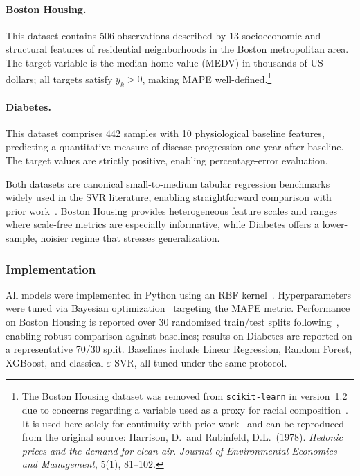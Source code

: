 \documentclass[mathematics,article,submit,pdftex,moreauthors]{Definitions/mdpi}
\begin{document}
\paragraph{Boston Housing.}

This dataset contains 506 observations described by 13
socioeconomic and structural features of residential
neighborhoods in the Boston metropolitan area.
The target variable is the median home value (MEDV) in
thousands of US dollars; all targets satisfy $y_k > 0$,
making MAPE well-defined.\footnote{The Boston Housing dataset
was removed from \texttt{scikit-learn} in version~1.2 due to
concerns regarding a variable used as a proxy for racial
composition~\cite{Pedregosa2011}. It is used here solely for
continuity with prior work~\cite{benavides2025support} and can
be reproduced from the original source: Harrison, D.\ and
Rubinfeld, D.L.\ (1978). \textit{Hedonic prices and the demand
for clean air}. \textit{Journal of Environmental Economics and
Management}, 5(1), 81--102.}


\paragraph{Diabetes.}
This dataset comprises 442 samples with 10 physiological
baseline features, predicting a quantitative measure of
disease progression one year after baseline.
The target values are strictly positive, enabling
percentage-error evaluation.

Both datasets are canonical small-to-medium tabular regression
benchmarks widely used in the SVR literature, enabling
straightforward comparison with prior work~\cite{Smola2004,Du2024}.
Boston Housing provides heterogeneous feature scales and ranges
where scale-free metrics are especially informative, while
Diabetes offers a lower-sample, noisier regime that stresses
generalization.

\subsubsection{Implementation}

All models were implemented in Python using an RBF
kernel~\cite{Pedregosa2011}.
Hyperparameters were tuned via Bayesian
optimization~\cite{Nogueira2014} targeting the MAPE metric.
Performance on Boston Housing is reported over 30 randomized
train/test splits following~\cite{benavides2025support},
enabling robust comparison against baselines; results on
Diabetes are reported on a representative 70/30 split.
Baselines include Linear Regression, Random Forest,
XGBoost, and classical $\varepsilon$-SVR, all tuned under
the same protocol.
\end{document}
